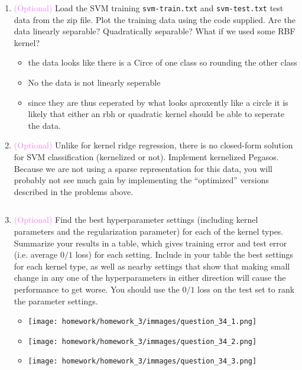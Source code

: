 \documentclass{article}
\theoremstyle{plain}
\theoremstyle{definition}
\begin{document}
\begin{enumerate}
  \setcounter{enumi}{\value{saveenum}}
\item \textcolor{violet}{(Optional)} Load the SVM training \texttt{svm-train.txt} and \texttt{svm-test.txt} test data from the zip file.
Plot the training data using the code supplied. Are the data linearly
separable? Quadratically separable? What if we used some RBF kernel?

\begin{itemize}
     \color{blue}
     \item the data looks like there is a Circe of one class so rounding the other class
    \item No the data is not linearly seperable
    \item since they are thus ceperated by what looks aproxently like a circle it is likely that either an rbh or quadratic kernel should be able to seperate the data.
\end{itemize}

\item \textcolor{violet}{(Optional)} Unlike for kernel ridge regression, there is no closed-form
    solution for SVM classification (kernelized or not). Implement kernelized
Pegasos. Because we are not using a sparse representation for this
data, you will probably not see much gain by implementing the ``optimized''
versions described in the problems above.
\begin{itemize}
    \color{blue}
      \inputminted[firstline=1124, lastline=1209, breaklines=True]{python}{hw_3.py}
\end{itemize}


\item \textcolor{violet}{(Optional)} Find the best hyperparameter settings (including kernel
parameters and the regularization parameter) for each of the kernel
types. Summarize your results in a table, which gives training error
and test error (i.e. average $0/1$ loss) for each setting. Include
in your table the best settings for each kernel type, as well as nearby
settings that show that making small change in any one of the hyperparameters
in either direction will cause the performance to get worse. You should
use the $0/1$ loss on the test set to rank the parameter settings. 
\begin{itemize}
    \color{blue}
    \item \texttt{[image: homework/homework\_3/immages/question\_34\_1.png]}
    \item \texttt{[image: homework/homework\_3/immages/question\_34\_2.png]}
    \item \texttt{[image: homework/homework\_3/immages/question\_34\_3.png]}
\end{itemize}



\end{enumerate}
\end{document}
